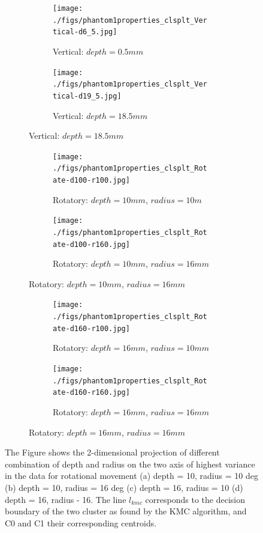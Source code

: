 \documentclass[]{interact}
\theoremstyle{plain}%
\theoremstyle{definition}
\theoremstyle{remark}
\begin{document}
\begin{figure}[]
	\centering
	\begin{subfigure}[b]{\textwidth}
		\begin{subfigure}[b]{.48\textwidth}
			\texttt{[image: ./figs/phantom1properties\_clsplt\_Vertical-d6\_5.jpg]}
			\caption{\tiny{Vertical: $depth=0.5mm$}}
			\label{ResVert:dn0}
		\end{subfigure} 
		\hspace{0.01\textwidth}
		\begin{subfigure}[b]{0.48\textwidth}
			\texttt{[image: ./figs/phantom1properties\_clsplt\_Vertical-d19\_5.jpg]}
			\caption{\tiny{Vertical: $depth=18.5mm$}}
			\label{ResVert:dn9}
		\end{subfigure}
	\vspace{20pt}
	\end{subfigure}
	\begin{subfigure}[b]{\textwidth}
		\begin{subfigure}[b]{.48\textwidth}
			\texttt{[image: ./figs/phantom1properties\_clsplt\_Rotate-d100-r100.jpg]}
			\caption{\tiny{Rotatory: $depth=10mm$, $radius=10m$}}
			\label{ResRot:100-100}
		\end{subfigure} 
		\hspace{0.01\textwidth}
		\begin{subfigure}[b]{0.48\textwidth}
			\texttt{[image: ./figs/phantom1properties\_clsplt\_Rotate-d100-r160.jpg]}
			\caption{\tiny{Rotatory: $depth=10mm$, $radius=16mm$}}
			\label{ResRot:100-160}
		\end{subfigure}
	\vspace{4pt}
	\end{subfigure}
	\begin{subfigure}[b]{\textwidth}
		\begin{subfigure}[b]{0.48\textwidth}
			\texttt{[image: ./figs/phantom1properties\_clsplt\_Rotate-d160-r100.jpg]}
			\caption{\tiny{Rotatory: $depth=16mm$, $radius=10mm$}}
			\label{ResRot:160-100}
		\end{subfigure}
		\hspace{0.01\textwidth}
		\begin{subfigure}[b]{0.48\textwidth}
			\texttt{[image: ./figs/phantom1properties\_clsplt\_Rotate-d160-r160.jpg]}
			\caption{\tiny{Rotatory: $depth=16mm$, $radius=16mm$}}
			\label{ResRot:160-160}
		\end{subfigure}
	\end{subfigure}
	\caption{The Figure shows the 2-dimensional projection
	of different combination of depth and radius on the two axis of highest variance in the
	data for rotational movement (a) depth = 10, radius = 10 deg (b) depth = 10, radius = 16 deg (c) depth = 16, radius = 10 (d) depth = 16, radius - 16. The line $l_{kmc}$ corresponds to the decision boundary of the two cluster as found by the KMC algorithm, and C0 and C1 their corresponding centroids.}
\end{figure}
\end{document}
